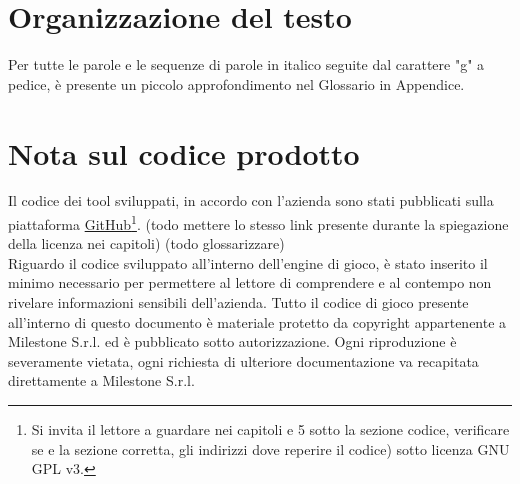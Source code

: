 \section{Organizzazione del testo}

Per tutte le parole e le sequenze di parole in italico seguite dal carattere "g" a pedice, è presente un piccolo approfondimento nel Glossario in Appendice.

\section{Nota sul codice prodotto}

Il codice dei tool sviluppati, in accordo con l'azienda sono stati pubblicati sulla piattaforma \hyperref{https://github.com/}{}{}{GitHub}\footnote{Si invita il lettore a guardare nei capitoli  e 5 sotto la sezione codice, verificare se e la sezione corretta, gli indirizzi dove reperire il codice) sotto licenza GNU GPL v3.}.
(todo mettere lo stesso link presente durante la spiegazione della licenza nei capitoli) (todo glossarizzare)\\

Riguardo il codice sviluppato all'interno dell'engine di gioco, è stato inserito il minimo necessario per permettere al lettore di comprendere e al contempo non rivelare informazioni sensibili dell'azienda. Tutto il codice di gioco presente all'interno di questo documento è materiale protetto da copyright appartenente a Milestone S.r.l. ed è pubblicato sotto autorizzazione. Ogni riproduzione è severamente vietata, ogni richiesta di ulteriore documentazione va recapitata direttamente a Milestone S.r.l.